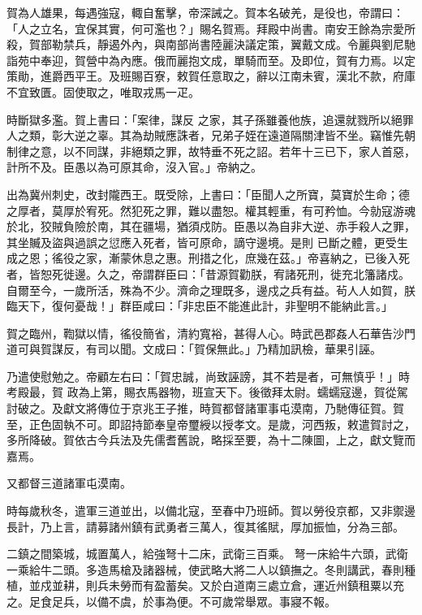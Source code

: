\begin{pinyinscope}
 賀為人雄果，每遇強寇，輙自奮擊，帝深誡之。賀本名破羌，是役也，帝謂曰：「人之立名，宜保其實，何可濫也？」賜名賀焉。拜殿中尚書。南安王餘為宗愛所殺，賀部勒禁兵，靜遏外內，與南部尚書陸麗決議定策，翼戴文成。令麗與劉尼馳詣苑中奉迎，賀營中為內應。俄而麗抱文成，單騎而至。及即位，賀有力焉。以定策勛，進爵西平王。及班賜百寮，敕賀任意取之，辭以江南未賓，漢北不款，府庫不宜致匱。固使取之，唯取戎馬一疋。



 時斷獄多濫。賀上書曰：「案律，謀反
 之家，其子孫雖養他族，追還就戮所以絕罪人之類，彰大逆之辜。其為劫賊應誅者，兄弟子姪在遠道隔關津皆不坐。竊惟先朝制律之意，以不同謀，非絕類之罪，故特垂不死之詔。若年十三已下，家人首惡，計所不及。臣愚以為可原其命，沒入官。」帝納之。



 出為冀州刺史，改封隴西王。既受除，上書曰：「臣聞人之所寶，莫寶於生命；德之厚者，莫厚於宥死。然犯死之罪，難以盡恕。權其輕重，有可矜恤。今勍寇游魂於北，狡賊負險於南，其在疆場，猶須戍防。臣愚以為自非大逆、赤手殺人之罪，其坐贓及盜與過誤之愆應入死者，皆可原命，謫守邊境。是則
 已斷之體，更受生成之恩；徭役之家，漸蒙休息之惠。刑措之化，庶幾在茲。」帝喜納之，已後入死者，皆恕死徙邊。久之，帝謂群臣曰：「昔源賀勸朕，宥諸死刑，徙充北籓諸戍。自爾至今，一歲所活，殊為不少。濟命之理既多，邊戍之兵有益。茍人人如賀，朕臨天下，復何憂哉！」群臣咸曰：「非忠臣不能進此計，非聖明不能納此言。」



 賀之臨州，鞫獄以情，徭役簡省，清約寬裕，甚得人心。時武邑郡姦人石華告沙門道可與賀謀反，有司以聞。文成曰：「賀保無此。」乃精加訊檢，華果引誣。



 乃遣使慰勉之。帝顧左右曰：「賀忠誠，尚致誣謗，其不若是者，可無慎乎！」時考殿最，賀
 政為上第，賜衣馬器物，班宣天下。後徵拜太尉。蠕蠕寇邊，賀從駕討破之。及獻文將傳位于京兆王子推，時賀都督諸軍事屯漠南，乃馳傳征賀。賀至，正色固執不可。即詔持節奉皇帝璽綬以授孝文。是歲，河西叛，敕遣賀討之，多所降破。賀依古今兵法及先儒耆舊說，略採至要，為十二陳圖，上之，獻文覽而嘉焉。



 又都督三道諸軍屯漠南。



 時每歲秋冬，遣軍三道並出，以備北寇，至春中乃班師。賀以勞役京都，又非禦邊長計，乃上言，請募諸州鎮有武勇者三萬人，復其徭賦，厚加振恤，分為三部。



 二鎮之間築城，城置萬人，給強弩十二床，武衛三百乘。
 弩一床給牛六頭，武衛一乘給牛二頭。多造馬槍及諸器械，使武略大將二人以鎮撫之。冬則講武，春則種植，並戍並耕，則兵未勞而有盈蓄矣。又於白道南三處立倉，運近州鎮租粟以充之。足食足兵，以備不虞，於事為便。不可歲常舉眾。事寢不報。




\end{pinyinscope}
